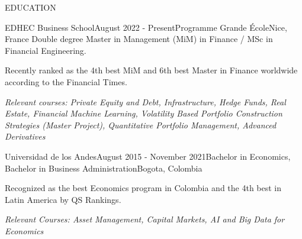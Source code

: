 \documentclass{resume} %
\begin{document}
%
%

\begin{rSection}{EDUCATION}

\vspace{0.3em}
\begin{rSubsection}{EDHEC Business School}{August 2022 - Present}{Programme Grande École}{Nice, France}
    Double degree Master in Management (MiM) in Finance / MSc in Financial Engineering.
    \item Recently ranked as the 4th best MiM and 6th best Master in Finance worldwide according to the Financial Times.
    \item \textit{Relevant courses: Private Equity and Debt, Infrastructure, Hedge Funds, Real Estate, Financial Machine Learning, Volatility Based Portfolio Construction Strategies (Master Project), Quantitative Portfolio Management, Advanced Derivatives}
\end{rSubsection}

\begin{rSubsection}{Universidad de los Andes}{August 2015 - November 2021}{Bachelor in Economics,  Bachelor in Business Administration}{Bogota, Colombia}
    \item Recognized as the best Economics program in Colombia and the 4th best in Latin America by QS Rankings.
    \item \textit{Relevant Courses: Asset Management, Capital Markets, AI and Big Data for Economics}
\end{rSubsection}

\end{rSection}

\vspace{0.5em}

%
%
\end{document}
